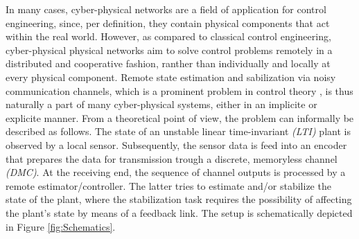 \documentclass[conference]{IEEEtran}
\begin{document}
	In many cases, cyber-physical networks are a field of application for control engineering, since, per definition, they contain physical components that act within the real world. 
	However, as compared to classical control engineering, cyber-physical physical networks aim to solve control problems remotely in a distributed and cooperative fashion, 
	ranther than individually and locally at every physical component. Remote state estimation and sabilization via noisy communication channels, which is a prominent problem 
	in control theory \cite{MS07, MS07SC}, is thus naturally a part of many cyber-physical systems, either in an implicite or explicite manner. 
	From a theoretical point of view, the problem can informally be described as follows. The state of an unstable linear time-invariant \emph{(LTI)} plant is observed by a local sensor. 
	Subsequently, the sensor data is feed into an encoder that prepares the data for transmission trough a discrete, memoryless channel \emph{(DMC)}. 
	At the receiving end, the sequence of channel outputs is processed by a remote estimator/controller. The latter tries to estimate and/or stabilize the state of the plant, where 
	the stabilization task requires the possibility of affecting the plant's state by means of a feedback link. The setup is schematically depicted in Figure \ref{fig:Schematics}.
\end{document}
